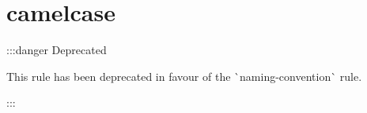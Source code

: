 \chapter{camelcase}
\hypertarget{md__c_1_2_users_2alexs_2source_2repos_2_s_q_8_term_project_8my_weather_2_s_q_8_term_project_8my_89c346f5d898b409218d2c7656d85016}{}\label{md__c_1_2_users_2alexs_2source_2repos_2_s_q_8_term_project_8my_weather_2_s_q_8_term_project_8my_89c346f5d898b409218d2c7656d85016}
\+::\+:danger Deprecated

This rule has been deprecated in favour of the \`{}naming-\/convention\`{} rule.

\+::\+: 